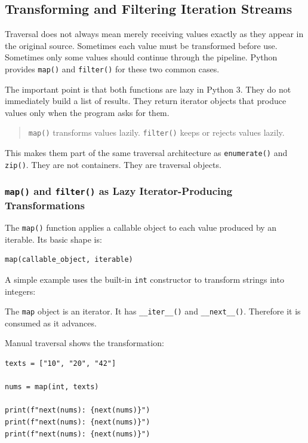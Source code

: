 \subsection{Transforming and Filtering Iteration Streams}

Traversal does not always mean merely receiving values exactly as they appear in the original source. Sometimes each value must be transformed before use. Sometimes only some values should continue through the pipeline. Python provides \texttt{map()} and \texttt{filter()} for these two common cases.

The important point is that both functions are lazy in Python 3. They do not immediately build a list of results. They return iterator objects that produce values only when the program asks for them.

\begin{quote}
\texttt{map()} transforms values lazily. \texttt{filter()} keeps or rejects values lazily.
\end{quote}

This makes them part of the same traversal architecture as \texttt{enumerate()} and \texttt{zip()}. They are not containers. They are traversal objects.

\subsubsection{\texttt{map()} and \texttt{filter()} as Lazy Iterator-Producing Transformations}

The \texttt{map()} function applies a callable object to each value produced by an iterable. Its basic shape is:

\begin{verbatim}
map(callable_object, iterable)
\end{verbatim}

A simple example uses the built-in \texttt{int} constructor to transform strings into integers:

The \texttt{map} object is an iterator. It has \texttt{\_\_iter\_\_()} and \texttt{\_\_next\_\_()}. Therefore it is consumed as it advances.

Manual traversal shows the transformation:

\begin{verbatim}
texts = ["10", "20", "42"]

nums = map(int, texts)

print(f"next(nums): {next(nums)}")
print(f"next(nums): {next(nums)}")
print(f"next(nums): {next(nums)}")
\end{verbatim}

